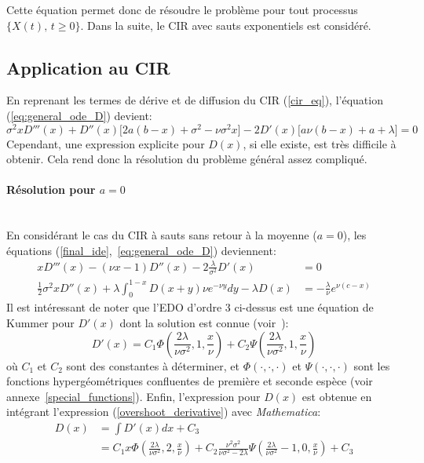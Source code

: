 Cette équation permet donc de résoudre le problème pour tout processus \(\{X(t),\,t\geq0\}\). Dans la suite, le \acs{CIR} avec sauts exponentiels est considéré.
\subsection{Application au CIR}
En reprenant les termes de dérive et de diffusion du \acs{CIR} (\ref{cir_eq}), l'équation (\ref{eq:general_ode_D}) devient:
\[
\sigma ^2 x D'''(x)+D''(x) \big[2 a (b-x)+\sigma ^2-\nu  \sigma ^2x\big]-2 D'(x) \big[a \nu  (b-x)+a+\lambda \big]=0
\]
Cependant, une expression explicite pour $D(x)$, si elle existe, est très difficile à obtenir. Cela rend donc la résolution du problème général assez compliqué. 
\paragraph{Résolution pour $a=0$}\phantom{}\\
En considérant le cas du \acs{CIR} à sauts sans retour à la moyenne ($a=0$), les équations (\ref{final_ide},~\ref{eq:general_ode_D}) deviennent:
\begin{equation}\label{overshoot_equations}
    \begin{aligned}
        xD'''(x)-(\nu x-1) D''(x)-2\frac{\lambda}{\sigma^2} D'(x)&=0 \\
        \frac{1}{2}\sigma^2xD''(x)+\lambda\int_0^{1-x}D(x+y)\nu e^{-\nu y}dy-\lambda D(x)&=-\frac{\lambda}{\nu}e^{\nu(c-x)}
    \end{aligned}
\end{equation}
Il est intéressant de noter que l'\acs{EDO} d'ordre 3 ci-dessus est une équation de Kummer pour \(D'(x)\) dont la solution est connue (voir~\cite{magnus1966}):
\begin{equation}\label{overshoot_derivative}
    D'(x)=C_1\Phi\left(\frac{2\lambda}{\nu\sigma^2},1,\frac{x}{\nu}\right)+C_2\Psi\left(\frac{2\lambda}{\nu\sigma^2},1,\frac{x}{\nu}\right)
\end{equation}
où $C_1$ et $C_2$ sont des constantes à déterminer, et $\Phi(\cdot, \cdot, \cdot)$ et $\Psi(\cdot, \cdot, \cdot)$ sont les fonctions hypergéométriques confluentes de première et seconde espèce (voir annexe~\ref{special_functions}). Enfin, l'expression pour \(D(x)\) est obtenue en intégrant l'expression (\ref{overshoot_derivative}) avec \textit{Mathematica}:
\[
\begin{aligned}
    D(x)&=\int D'(x)dx+C_3\\
    &=C_1 x \Phi\left(\frac{2 \lambda }{\nu \sigma^2},2,\frac{x}{\nu }\right)+C_2 \frac{\nu^2\sigma^2}{\nu\sigma^2-2\lambda}\Psi\left(\frac{2 \lambda }{\nu \sigma^2}-1,0,\frac{x}{\nu }\right)+C_3
\end{aligned}
\]
